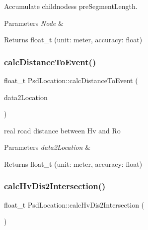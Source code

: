 Accumulate childnodes\textquotesingle{}s pre\+Segment\+Length. 


\begin{DoxyParams}{Parameters}
{\em Node} & \\
\hline
\end{DoxyParams}
\begin{DoxyReturn}{Returns}
float\+\_\+t (unit\+: meter, accuracy\+: float) 
\end{DoxyReturn}
\mbox{\label{class_psd_location_a8b78f66d995b0d621ddb4ed760e1e6a7}} 
\subsubsection{\texorpdfstring{calc\+Distance\+To\+Event()}{calcDistanceToEvent()}}
{\footnotesize\ttfamily float\+\_\+t Psd\+Location\+::calc\+Distance\+To\+Event (\begin{DoxyParamCaption}\item[{\hyperlink{_psd_location_8h_a1e3a92020005d2a81aa50ba5ae9b129c}{Data2\+Location}}]{data2\+Location }\end{DoxyParamCaption})}



real road distance between Hv and Ro 


\begin{DoxyParams}{Parameters}
{\em data2\+Location} & \\
\hline
\end{DoxyParams}
\begin{DoxyReturn}{Returns}
float\+\_\+t (unit\+: meter, accuracy\+: float) 
\end{DoxyReturn}
\mbox{\label{class_psd_location_a3e8f14fdfe1e6d1495902d265ad6ea93}} 
\subsubsection{\texorpdfstring{calc\+Hv\+Dis2\+Intersection()}{calcHvDis2Intersection()}}
{\footnotesize\ttfamily float\+\_\+t Psd\+Location\+::calc\+Hv\+Dis2\+Intersection (\begin{DoxyParamCaption}{ }\end{DoxyParamCaption})}



